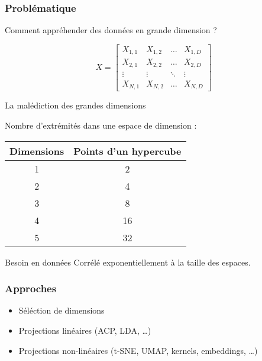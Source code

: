 \begin{frame}
  \frametitle{Problématique}
    \begin{center}
      Comment appréhender des données en grande dimension ?
    \end{center}
    \[
    X = \begin{bmatrix}
      X_{1,1} & X_{1,2} & \dots  & X_{1,D} \\
      X_{2,1} & X_{2,2} & \dots  & X_{2,D} \\
      \vdots & \vdots & \ddots & \vdots \\
      X_{N,1} & X_{N,2} & \dots  & X_{N,D}
    \end{bmatrix}
    \]
\end{frame}

\begin{frame}{La malédiction des grandes dimensions}
    \begin{center}
      Nombre d'extrémités dans une espace de dimension : \\
      $\;$ \\
      \begin{tabular}{cc}
        Dimensions & Points d'un hypercube \\
        \midrule
        1 & 2 \\
        2 & 4 \\
        3 & 8 \\
        4 & 16 \\
        5 & 32 \\
      \end{tabular}
    \end{center}

  \begin{alertblock}{Besoin en données}
    Corrélé exponentiellement à la taille des espaces.
  \end{alertblock}
\end{frame}

\begin{frame}
  \frametitle{Approches}
    \begin{itemize}
    \item Séléction de dimensions
    \item Projections linéaires (ACP, LDA, …)
    \item Projections non-linéaires (t-SNE, UMAP, kernels, embeddings, …)
    \end{itemize}
\end{frame}
